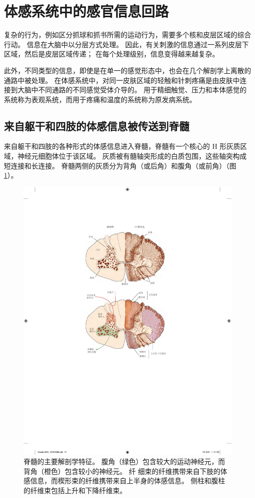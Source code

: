 \section{体感系统中的感官信息回路}

复杂的行为，例如区分抓球和抓书所需的运动行为，需要多个核和皮层区域的综合行动。 
信息在大脑中以分层方式处理。 
因此，有关刺激的信息通过一系列皮层下区域，然后是皮层区域传递； 
在每个处理级别，信息变得越来越复杂。


此外，不同类型的信息，即使是在单一的感觉形态中，也会在几个解剖学上离散的通路中被处理。 
在体感系统中，对同一皮肤区域的轻触和针刺疼痛是由皮肤中连接到大脑中不同通路的不同感觉受体介导的。 
用于精细触觉、压力和本体感觉的系统称为表观系统，而用于疼痛和温度的系统称为原发病系统。



\subsection{来自躯干和四肢的体感信息被传送到脊髓}

来自躯干和四肢的各种形式的体感信息进入脊髓，脊髓有一个核心的 H 形灰质区域，神经元细胞体位于该区域。 
灰质被有髓轴突形成的白质包围，这些轴突构成短连接和长连接。
脊髓两侧的灰质分为背角（或后角）和腹角（或前角）（图 \ref{fig:4_3}）。


\begin{figure}[htbp]
	\centering
	\includegraphics[width=1.0\linewidth]{chap04/fig_4_3}
	\caption{脊髓的主要解剖学特征。 
		腹角（绿色）包含较大的运动神经元，而背角（橙色）包含较小的神经元。 纤
		细束的纤维携带来自下肢的体感信息，而楔形束的纤维携带来自上半身的体感信息。 
		侧柱和腹柱的纤维束包括上升和下降纤维束。}
	\label{fig:4_3}
\end{figure}



